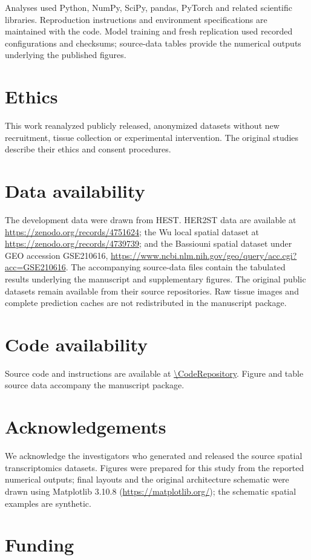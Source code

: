 Analyses used Python, NumPy\cite{harris2020}, SciPy\cite{virtanen2020}, pandas, PyTorch and related scientific libraries. Reproduction instructions and environment specifications are maintained with the code. Model training and fresh replication used recorded configurations and checksums; source-data tables provide the numerical outputs underlying the published figures. 

\section{Ethics}
This work reanalyzed publicly released, anonymized datasets without new recruitment, tissue collection or experimental intervention. The original studies describe their ethics and consent procedures\cite{andersson2021,wu2021,bassiouni2023}.
\section{Data availability}
The development data were drawn from HEST\cite{jaume2024}. HER2ST data are available at \url{https://zenodo.org/records/4751624}; the Wu local spatial dataset at \url{https://zenodo.org/records/4739739}; and the Bassiouni spatial dataset under GEO accession GSE210616, \url{https://www.ncbi.nlm.nih.gov/geo/query/acc.cgi?acc=GSE210616}. The accompanying source-data files contain the tabulated results underlying the manuscript and supplementary figures. The original public datasets remain available from their source repositories. Raw tissue images and complete prediction caches are not redistributed in the manuscript package. 

\section{Code availability}
Source code and instructions are available at \url{\CodeRepository}. Figure and table source data accompany the manuscript package.\par
\section{Acknowledgements}
We acknowledge the investigators who generated and released the source spatial transcriptomics datasets. Figures were prepared for this study from the reported numerical outputs; final layouts and the original architecture schematic were drawn using Matplotlib 3.10.8 (\url{https://matplotlib.org/}); the schematic spatial examples are synthetic. 
\section{Funding}

